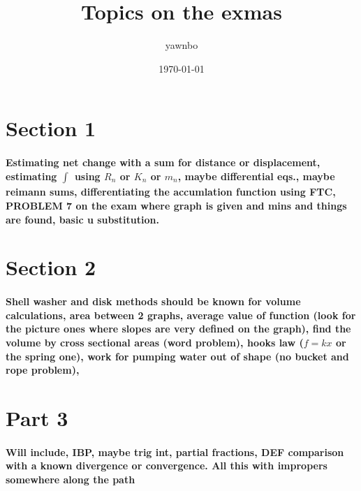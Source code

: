 \documentclass[a4paper]{article}
\title{Topics on the exmas}
\author{yawnbo}
\date{\today}
\begin{document}
\section*{Section 1}%
\label{sec:Section 1}
\paragraph{Estimating net change with a sum for distance or displacement, estimating $\int_{}^{} $ using $R_n$ or $K_{n}$ or $m_{n}$, maybe differential eqs., maybe reimann sums, differentiating the accumlation function using FTC, PROBLEM 7 on the exam where graph is given and mins and things are found, basic u substitution. }

\section*{Section 2}%
\label{sec:Section 2}
\paragraph{Shell washer and disk methods should be known for volume calculations, area between 2 graphs, average value of function (look for the picture ones where slopes are very defined on the graph), find the volume by cross sectional areas (word problem), hooks law ($f=kx$ or the spring one), work for pumping water out of shape (no bucket and rope problem), }

  \section*{Part 3}%
  \label{sec:Part 3}
  \paragraph{Will include, IBP, maybe trig int, partial fractions, DEF comparison with a known divergence or convergence. All this with impropers somewhere along the path}
  
\end{document}
